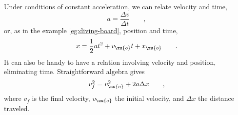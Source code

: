 Under conditions of constant acceleration,
we can relate velocity and time,
\begin{equation*}
  a = \frac{\Delta v}{\Delta t} \qquad ,
\end{equation*}
or, as in the example \ref{eg:diving-board}, position and time,
\begin{equation*}
  x =  \frac{1}{2}at^2 + v_\zu{o} t + x_\zu{o} \qquad .
\end{equation*}
It can also be handy to have a relation involving velocity and position, eliminating time.
Straightforward algebra gives
\begin{equation*}
  v_f^2 = v_\zu{o}^2 + 2 a \Delta x \qquad ,
\end{equation*}
where $v_f$ is the final velocity, $v_\zu{o}$ the initial velocity, and $\Delta x$ the
distance traveled.

\vspace{0mm plus 5mm}


\vspace{0mm plus 5mm}


\vspace{0mm plus 5mm}

